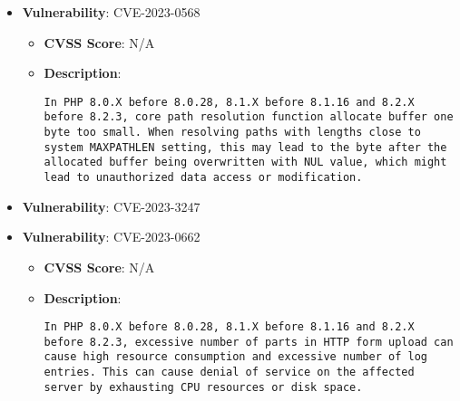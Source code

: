 \documentclass{article}
\begin{document}
\begin{itemize}
    
        \item \textbf{Vulnerability}: CVE-2023-0568
        \begin{itemize}
            \item \textbf{CVSS Score}:  N/A 
            \item \textbf{Description}:
            \parbox[t]{0.9\linewidth}{
                \verb|In PHP 8.0.X before 8.0.28, 8.1.X before 8.1.16 and 8.2.X before 8.2.3, core path resolution function allocate buffer one byte too small. When resolving paths with lengths close to system MAXPATHLEN setting, this may lead to the byte after the allocated buffer being overwritten with NUL value, which might lead to unauthorized data access or modification. |
            }
        \end{itemize}
    
        \item \textbf{Vulnerability}: CVE-2023-3247
    
        \item \textbf{Vulnerability}: CVE-2023-0662
        \begin{itemize}
            \item \textbf{CVSS Score}:  N/A 
            \item \textbf{Description}:
            \parbox[t]{0.9\linewidth}{
                \verb|In PHP 8.0.X before 8.0.28, 8.1.X before 8.1.16 and 8.2.X before 8.2.3, excessive number of parts in HTTP form upload can cause high resource consumption and excessive number of log entries. This can cause denial of service on the affected server by exhausting CPU resources or disk space. |
            }
        \end{itemize}
    

\end{itemize}
\end{document}
